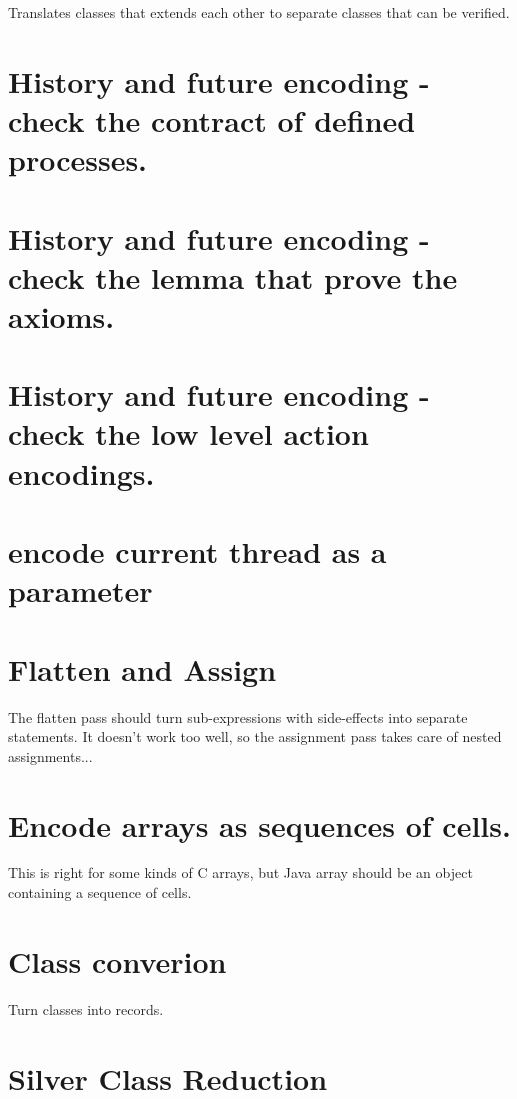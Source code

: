 Translates classes that extends each other to separate classes
that can be verified.

\section{History and future encoding - check the contract of defined processes.}

\section{History and future encoding - check the lemma that prove the axioms.}

\section{History and future encoding - check the low level action encodings.}


\section{encode current thread as a parameter}


\section{Flatten and Assign}

The flatten pass should turn sub-expressions with side-effects
into separate statements. It doesn't work too well,
so the assignment pass takes care of nested assignments...


\section{Encode arrays as sequences of cells.}

This is right for some kinds of C arrays, but Java array should
be an object containing a sequence of cells.

\section{Class converion}

Turn classes into records.

\section{Silver Class Reduction}

